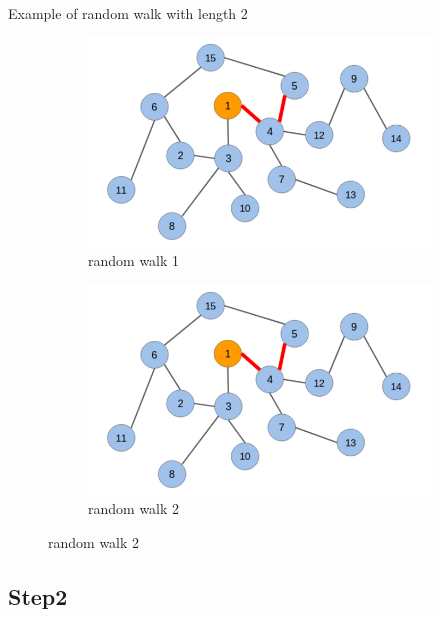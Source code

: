     \paragraph{} Example of random walk with length 2
    \begin{figure}[h]
        \centering
        \begin{subfigure}[b]{0.5\textwidth}
                    \includegraphics[width=\textwidth]{tex/img/G1.png}
                    \caption{random walk 1}
            \end{subfigure}%
            \hfill
        \begin{subfigure}[b]{0.5\textwidth}
                    \includegraphics[width=\textwidth]{tex/img/G1.png}
                    \caption{random walk 2}
           \end{subfigure}%
        \end{figure}
    \subsection{Step2}
